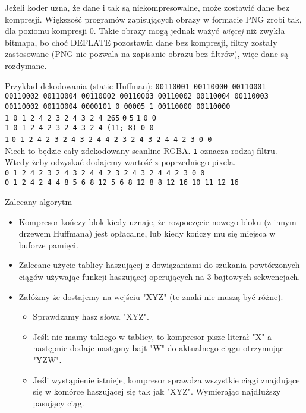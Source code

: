 \documentclass[presentation]{beamer}
\begin{document}
\begin{frame}[label={sec:orgb667f83}]{Jeżeli koder uzna, że dane i tak są niekompresowalne, może zostawić dane bez kompresji.}
Większość programów zapisujących obrazy w formacie PNG zrobi tak, dla poziomu
kompresji 0. Takie obrazy mogą jednak ważyć \emph{więcej} niż zwykła bitmapa, bo
choć DEFLATE pozostawia dane bez kompresji, filtry zostały zastosowane (PNG
nie pozwala na zapisanie obrazu bez filtrów), więc dane są rozdymane.
\end{frame}


\begin{frame}[label={sec:org6f61da2}]{Przykład dekodowania (static Huffman):}
\texttt{00110001 00110000 00110001 00110002 00110004 00110002 00110003 00110002 00110004 00110003 00110002 00110004 0000101 0 00005 1 00110000 00110000} \\

\texttt{1 0 1 2 4 2 3 2 4 3 2 4 265} {\color{red}\texttt{0}} \texttt{5} {\color{red}\texttt{1}} \texttt{0 0} \\

\texttt{1 0 1 2 4 2 3 2 4 3 2 4 (11; 8) 0 0} \\

{\color{red}\texttt{1}} \texttt{0 1 2 4 2 3 2 4 3 2 4 4 2 3 2 4 3 2 4 4 2 3 0 0} \\

Niech to będzie cały zdekodowany scanline
RGBA. {\color{red}\texttt{1}} oznacza rodzaj
filtru. Wtedy żeby odzyskać dodajemy wartość z poprzedniego pixela. \\
\texttt{0 1 2 4  2 3 2 4  3 2 4 4   2 3 2 4   3 2 4  4   2  3  0  0} \\

\texttt{0 1 2 4  2 4 4 8  5 6 8 12  5 6 8 12  8 8 12 16  10 11 12 16} \\
\end{frame}

\begin{frame}[label={sec:orgdaac855}]{Zalecany algorytm}
\begin{itemize}
\item Kompresor kończy blok kiedy uznaje, że rozpoczęcie nowego bloku
(z innym drzewem Huffmana) jest opłacalne, lub kiedy kończy mu
się miejsca w buforze pamięci.
\item Zalecane użycie tablicy haszującej z dowiązaniami do szukania
powtórzonych ciągów używając funkcji haszującej operujących na
3-bajtowych sekwencjach.
\item Załóżmy że dostajemy na wejściu "XYZ" (te znaki nie muszą być
różne).
\begin{itemize}
\item Sprawdzamy hasz słowa "XYZ".
\item Jeśli nie mamy takiego w tablicy, to kompresor pisze literał
"X" a następnie dodaje następny bajt "W" do aktualnego ciągu
otrzymując "YZW".
\item Jeśli wystąpienie istnieje, kompresor sprawdza wszystkie ciągi
znajdujące się w komórce haszującej się tak jak
"XYZ". Wymierając najdłuższy pasujący ciąg.
\end{itemize}
\end{itemize}
\end{frame}
\end{document}
